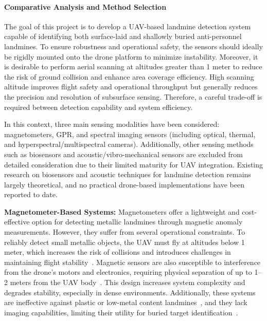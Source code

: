 \paragraph{Comparative Analysis and Method Selection}

The goal of this project is to develop a UAV-based landmine detection system capable of identifying both surface-laid and shallowly buried anti-personnel landmines. To ensure robustness and operational safety, the sensors should ideally be rigidly mounted onto the drone platform to minimize instability. Moreover, it is desirable to perform aerial scanning at altitudes greater than 1 meter to reduce the risk of ground collision and enhance area coverage efficiency. High scanning altitude improves flight safety and operational throughput but generally reduces the precision and resolution of subsurface sensing. Therefore, a careful trade-off is required between detection capability and system efficiency.

In this context, three main sensing modalities have been considered: magnetometers, GPR, and spectral imaging sensors (including optical, thermal, and hyperspectral/multispectral cameras). Additionally, other sensing methods such as biosensors and acoustic/vibro-mechanical sensors are excluded from detailed consideration due to their limited maturity for UAV integration. Existing research on biosensors and acoustic techniques for landmine detection remains largely theoretical, and no practical drone-based implementations have been reported to date.

\textbf{Magnetometer-Based Systems:} Magnetometers offer a lightweight and cost-effective option for detecting metallic landmines through magnetic anomaly measurements. However, they suffer from several operational constraints. To reliably detect small metallic objects, the UAV must fly at altitudes below 1 meter, which increases the risk of collisions and introduces challenges in maintaining flight stability~\cite{yoo2020drone,Yoo2024UnmannedAV}. Magnetic sensors are also susceptible to interference from the drone's motors and electronics, requiring physical separation of up to 1--2 meters from the UAV body~\cite{Yoo2024UnmannedAV,rs16162916}. This design increases system complexity and degrades stability, especially in dense environments. Additionally, these systems are ineffective against plastic or low-metal content landmines~\cite{garcia2020airborne,vsipovs2020lightweight}, and they lack imaging capabilities, limiting their utility for buried target identification~\cite{lee2023modeling}.

